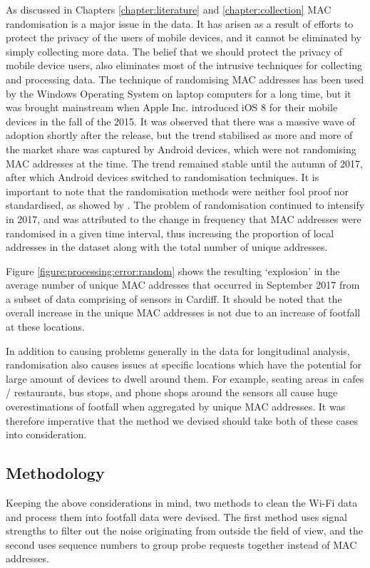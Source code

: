 As discussed in Chapters \ref{chapter:literature} and \ref{chapter:collection} MAC randomisation is a major issue in the data.
It has arisen as a result of efforts to protect the privacy of the users of mobile devices, and it cannot be eliminated by simply collecting more data.
The belief that we should protect the privacy of mobile device users, also eliminates most of the intrusive techniques for collecting and processing data.
The technique of randomising MAC addresses has been used by the Windows Operating System on laptop computers for a long time, but it was brought mainstream when Apple Inc. introduced iOS 8 for their mobile devices in the fall of the 2015.
It was observed that there was a massive wave of adoption shortly after the release, but the trend stabilised as more and more of the market share was captured by Android devices, which were not randomising MAC addresses at the time.
The trend remained stable until the autumn of 2017, after which Android devices switched to randomisation techniques.
It is important to note that the randomisation methods were neither fool proof nor standardised, as showed by \citep{vanhoef2016}.
The problem of randomisation continued to intensify in 2017, and was attributed to the change in frequency that MAC addresses were randomised in a given time interval, thus increasing the proportion of local addresses in the dataset along with the total number of unique addresses.

Figure \ref{figure:processing:error:random} shows the resulting ‘explosion’ in the average number of unique MAC addresses that occurred in September 2017 from a subset of data comprising of sensors in Cardiff.
It should be noted that the overall increase in the unique MAC addresses is not due to an increase of footfall at these locations.

In addition to causing problems generally in the data for longitudinal analysis, randomisation also causes issues at specific locations which have the potential for large amount of devices to dwell around them.
For example, seating areas in cafes / restaurants, bus stops, and phone shops around the sensors all cause huge overestimations of footfall when aggregated by unique MAC addresses.
It was therefore imperative that the method we devised should take both of these cases into consideration.


\subsection{Methodology}
Keeping the above considerations in mind, two methods to clean the Wi-Fi data and process them into footfall data were devised.
The first method uses signal strengths to filter out the noise originating from outside the field of view, and the second uses sequence numbers to group probe requests together instead of MAC addresses.

